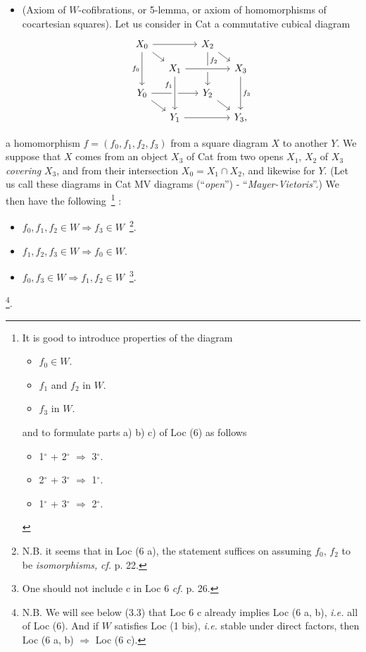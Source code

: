\begin{itemize}[leftmargin=5em,labelwidth=4em,align=left]
\item[\textbf{Loc 6}] (Axiom of $W$-cofibrations, or 5-lemma, or axiom of homomorphisms of cocartesian squares). Let us consider in Cat a commutative cubical diagram
\[
\begin{tikzcd}[row sep=small,column sep=small]
X_0 \arrow[rr] \arrow[dr] \arrow[dd,"f_0"'] & & X_2 \arrow[dr] \arrow[dd,"f_2" near start] & \\
& X_1 \arrow[rr,crossing over] & & X_3 \arrow[dd,"f_3"] \\
Y_0 \arrow[rr] \arrow[dr] & & Y_2 \arrow[dr] & \\
& Y_1 \arrow[rr] \arrow[from=uu,crossing over,"f_1"' near start] & & Y_3,
\end{tikzcd}
\]
\end{itemize}
a homomorphism $f=(f_0,f_1,f_2,f_3)$ from a square diagram $X$ to another $Y$. We suppose that $X$ comes from an object $X_3$ of Cat from two opens $X_1$, $X_2$ of $X_3$ \textit{covering} $X_3$, and from their intersection $X_0=X_1\cap X_2$, and likewise for $Y$. (Let us call these diagrams in Cat MV diagrams (``\textit{open}'') - ``\textit{Mayer-Vietoris}''.) We then have the following~\footnote[9]{It is good to introduce properties of the diagram
\begin{itemize}[leftmargin=3em,labelwidth=2.5em,align=right]
\item[1$^{\circ}$)] $f_0\in W$.
\item[2$^{\circ}$)] $f_1$ and $f_2$ in $W$.
\item[3$^{\circ}$)] $f_3$ in $W$.
\end{itemize}
and to formulate parts a) b) c) of Loc (6) as follows
\begin{itemize}[leftmargin=3em,labelwidth=2.5em,align=right]
\item[a)] 1$^{\circ}$ + 2$^{\circ}$ $\Longrightarrow$ 3$^{\circ}$.
\item[b)] 2$^{\circ}$ + 3$^{\circ}$ $\Longrightarrow$ 1$^{\circ}$.
\item[c)] 1$^{\circ}$ + 3$^{\circ}$ $\Longrightarrow$ 2$^{\circ}$.
\end{itemize}} :
\begin{itemize}[leftmargin=3em,labelwidth=2.5em,align=right]
\item[a)] $f_0,f_1,f_2\in W\Longrightarrow f_3\in W$~\footnote[10]{N.B. it seems that in Loc (6 a), the statement suffices on assuming $f_0$, $f_2$ to be \textit{isomorphisms,} \textit{cf.} p. 22.}.
\item[b)] $f_1,f_2,f_3\in W\Longrightarrow f_0\in W$.
\item[c)] $f_0,f_3\in W\Longrightarrow f_1,f_2\in W$~\footnote[11]{One should not include c in Loc 6 \textit{cf.} p. 26.}.
\end{itemize}
\noindent\footnote[12]{N.B. We will see below (3.3) that Loc 6 c already implies Loc (6 a, b), \textit{i.e.} all of Loc (6). And if $W$ satisfies Loc (1 bis), \textit{i.e.} stable under direct factors, then Loc (6 a, b) $\Longrightarrow$ Loc (6 c).}.

